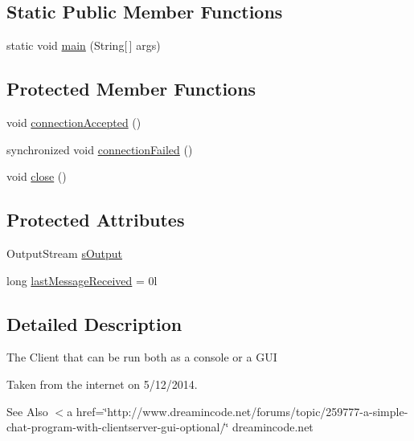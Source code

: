 \subsection*{Static Public Member Functions}
\begin{DoxyCompactItemize}
\item 
static void \hyperlink{classgov_1_1fnal_1_1ppd_1_1dd_1_1chat_1_1MessagingClient_aecbd81343fff7acb75d14ba29c973ed3}{main} (String\mbox{[}$\,$\mbox{]} args)
\end{DoxyCompactItemize}
\subsection*{Protected Member Functions}
\begin{DoxyCompactItemize}
\item 
void \hyperlink{classgov_1_1fnal_1_1ppd_1_1dd_1_1chat_1_1MessagingClient_ae7a2a256431770ac9b0f06d444aa636e}{connection\-Accepted} ()
\item 
synchronized void \hyperlink{classgov_1_1fnal_1_1ppd_1_1dd_1_1chat_1_1MessagingClient_ab42c0b4f0a822c6d2612f1121698ae01}{connection\-Failed} ()
\item 
void \hyperlink{classgov_1_1fnal_1_1ppd_1_1dd_1_1chat_1_1MessagingClient_a701c9889979e93718a0066cb45f063bb}{close} ()
\end{DoxyCompactItemize}
\subsection*{Protected Attributes}
\begin{DoxyCompactItemize}
\item 
Output\-Stream \hyperlink{classgov_1_1fnal_1_1ppd_1_1dd_1_1chat_1_1MessagingClient_aad2bc447bb305f210db3d55142adc077}{s\-Output}
\item 
long \hyperlink{classgov_1_1fnal_1_1ppd_1_1dd_1_1chat_1_1MessagingClient_a5a6bddbcf19712e979b10e3f122c29bc}{last\-Message\-Received} = 0l
\end{DoxyCompactItemize}


\subsection{Detailed Description}
The Client that can be run both as a console or a G\-U\-I 

Taken from the internet on 5/12/2014. \begin{DoxySeeAlso}{See Also}
$<$a href=\char`\"{}http\-://www.\-dreamincode.\-net/forums/topic/259777-\/a-\/simple-\/chat-\/program-\/with-\/clientserver-\/gui-\/optional/\char`\"{} dreamincode.\-net 
\end{DoxySeeAlso}


